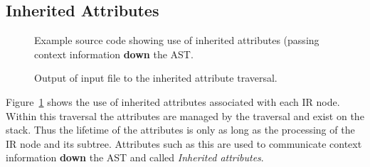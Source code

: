 \subsection{Inherited Attributes}

\begin{figure}[!h]
{\indent
{\mySmallFontSize


\begin{latexonly}
   
\end{latexonly}

\begin{htmlonly}
   
\end{htmlonly}

}
}
\caption{Example source code showing use of inherited attributes (passing context
         information {\bf down} the AST.}
\label{Tutorial:exampleInheritedAttributeTraversal}
\end{figure}

\begin{figure}[!h]
{\indent
{\mySmallFontSize


\begin{latexonly}
   
\end{latexonly}

\begin{htmlonly}
   
\end{htmlonly}

}
}
\caption{Output of input file to the inherited attribute traversal.}
\label{Tutorial:exampleOutput_InheritedAttributeTraversal}
\end{figure}

Figure~\ref{Tutorial:exampleInheritedAttributeTraversal} shows the use
of inherited attributes associated with each IR node.  Within this
traversal the attributes are managed by the traversal and exist on the
stack.  Thus the lifetime of the attributes is only as long as the
processing of the IR node and its subtree.  Attributes such as this
are used to communicate context information {\bf down} the AST and
called {\em Inherited attributes}.

